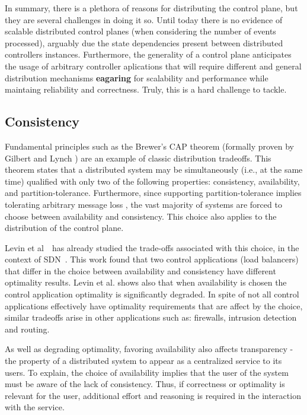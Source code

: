 In summary, there is a plethora of reasons for distributing the control plane, but they are several challenges in doing it so. 
Until today there is no evidence of scalable distributed control planes (when considering the number of events processed), arguably due the state dependencies present between distributed controllers instances. 
Furthermore, the generality of a control plane anticipates the usage of arbitrary controller aplications that will require different and general distribution mechanisms \textbf{eagaring} for scalability and performance while maintaing reliability and correctness.
Truly, this is a hard challenge to tackle. 

\subsection{Consistency}
Fundamental principles such as the  Brewer's CAP theorem \cite{Brewer:fk} (formally proven by Gilbert and Lynch \cite{Gilbert:2002il}) are an example of classic distribution tradeoffs. This theorem states that a distributed system may be simultaneously (i.e., at the same time) qualified with only two of the following properties: consistency, availability, and partition-tolerance. Furthermore, since supporting partition-tolerance implies tolerating arbitrary message loss  \cite{Gilbert:2002il},  the vast majority of systems are forced to choose between availability and consistency. This choice also applies to the distribution of the control plane. 

Levin et al~\etal\  has already studied the trade-offs associated with this choice, in the context of SDN~\cite{Levin:2012bt}. 
This work found that two control applications (load balancers) that differ in the choice between availability and consistency have different optimality results. Levin et al. shows also that when availability is chosen the control application optimality is significantly degraded. In spite of not all control applications effectively have optimality requirements that are affect by the choice, similar tradeoffs arise in other applications such as: firewalls, intrusion detection and routing.

As well as degrading optimality, favoring availability also affects transparency - the property of a distributed system to appear as a centralized service to its users. To explain, the choice of availability implies that the user of the system must be aware of the lack of consistency. Thus, if correctness or optimality is relevant for the user, additional effort and reasoning is required in the interaction with the service. 

